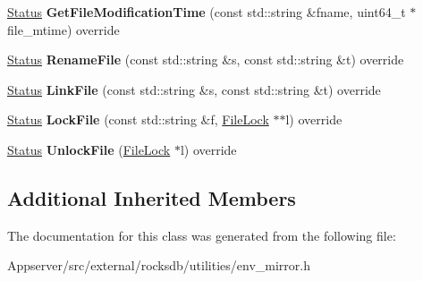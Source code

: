 \begin{DoxyCompactItemize}
\item 
\hyperlink{classrocksdb_1_1Status}{Status} {\bfseries Get\+File\+Modification\+Time} (const std\+::string \&fname, uint64\+\_\+t $\ast$file\+\_\+mtime) override\hypertarget{classrocksdb_1_1EnvMirror_a3ad82605cad55c6e4973a2fe5ca05d60}{}\label{classrocksdb_1_1EnvMirror_a3ad82605cad55c6e4973a2fe5ca05d60}

\item 
\hyperlink{classrocksdb_1_1Status}{Status} {\bfseries Rename\+File} (const std\+::string \&s, const std\+::string \&t) override\hypertarget{classrocksdb_1_1EnvMirror_ae59670ffb6ebe2e48e6dbac866d7fcb9}{}\label{classrocksdb_1_1EnvMirror_ae59670ffb6ebe2e48e6dbac866d7fcb9}

\item 
\hyperlink{classrocksdb_1_1Status}{Status} {\bfseries Link\+File} (const std\+::string \&s, const std\+::string \&t) override\hypertarget{classrocksdb_1_1EnvMirror_ab11999d851a8051d07e48d2a081b6196}{}\label{classrocksdb_1_1EnvMirror_ab11999d851a8051d07e48d2a081b6196}

\item 
\hyperlink{classrocksdb_1_1Status}{Status} {\bfseries Lock\+File} (const std\+::string \&f, \hyperlink{classrocksdb_1_1FileLock}{File\+Lock} $\ast$$\ast$l) override\hypertarget{classrocksdb_1_1EnvMirror_a8ff9c4ee9b25498704ff4685c073d14b}{}\label{classrocksdb_1_1EnvMirror_a8ff9c4ee9b25498704ff4685c073d14b}

\item 
\hyperlink{classrocksdb_1_1Status}{Status} {\bfseries Unlock\+File} (\hyperlink{classrocksdb_1_1FileLock}{File\+Lock} $\ast$l) override\hypertarget{classrocksdb_1_1EnvMirror_a9cf29cccefd183106a44d7810f44b83c}{}\label{classrocksdb_1_1EnvMirror_a9cf29cccefd183106a44d7810f44b83c}

\end{DoxyCompactItemize}
\subsection*{Additional Inherited Members}


The documentation for this class was generated from the following file\+:\begin{DoxyCompactItemize}
\item 
Appserver/src/external/rocksdb/utilities/env\+\_\+mirror.\+h\end{DoxyCompactItemize}
